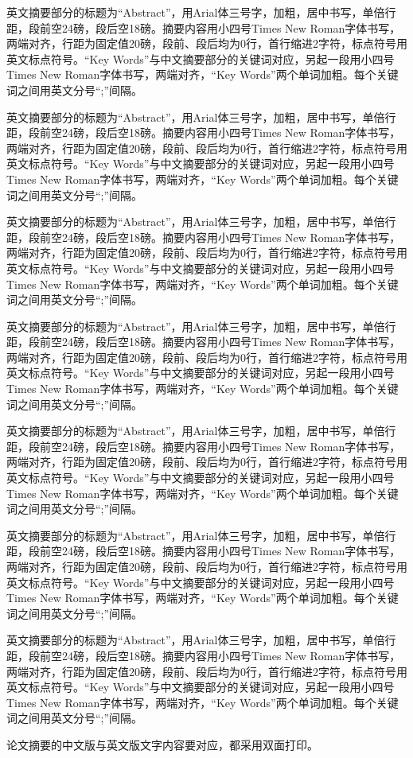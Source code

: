 \begin{enabstract}
	
	英文摘要部分的标题为“Abstract”，用Arial体三号字，加粗，居中书写，单倍行距，段前空24磅，段后空18磅。摘要内容用小四号Times New Roman字体书写，两端对齐，行距为固定值20磅，段前、段后均为0行，首行缩进2字符，标点符号用英文标点符号。“Key Words”与中文摘要部分的关键词对应，另起一段用小四号Times New Roman字体书写，两端对齐，“Key Words”两个单词加粗。每个关键词之间用英文分号“;”间隔。
	
	英文摘要部分的标题为“Abstract”，用Arial体三号字，加粗，居中书写，单倍行距，段前空24磅，段后空18磅。摘要内容用小四号Times New Roman字体书写，两端对齐，行距为固定值20磅，段前、段后均为0行，首行缩进2字符，标点符号用英文标点符号。“Key Words”与中文摘要部分的关键词对应，另起一段用小四号Times New Roman字体书写，两端对齐，“Key Words”两个单词加粗。每个关键词之间用英文分号“;”间隔。
	
	英文摘要部分的标题为“Abstract”，用Arial体三号字，加粗，居中书写，单倍行距，段前空24磅，段后空18磅。摘要内容用小四号Times New Roman字体书写，两端对齐，行距为固定值20磅，段前、段后均为0行，首行缩进2字符，标点符号用英文标点符号。“Key Words”与中文摘要部分的关键词对应，另起一段用小四号Times New Roman字体书写，两端对齐，“Key Words”两个单词加粗。每个关键词之间用英文分号“;”间隔。
	
	英文摘要部分的标题为“Abstract”，用Arial体三号字，加粗，居中书写，单倍行距，段前空24磅，段后空18磅。摘要内容用小四号Times New Roman字体书写，两端对齐，行距为固定值20磅，段前、段后均为0行，首行缩进2字符，标点符号用英文标点符号。“Key Words”与中文摘要部分的关键词对应，另起一段用小四号Times New Roman字体书写，两端对齐，“Key Words”两个单词加粗。每个关键词之间用英文分号“;”间隔。
	
	英文摘要部分的标题为“Abstract”，用Arial体三号字，加粗，居中书写，单倍行距，段前空24磅，段后空18磅。摘要内容用小四号Times New Roman字体书写，两端对齐，行距为固定值20磅，段前、段后均为0行，首行缩进2字符，标点符号用英文标点符号。“Key Words”与中文摘要部分的关键词对应，另起一段用小四号Times New Roman字体书写，两端对齐，“Key Words”两个单词加粗。每个关键词之间用英文分号“;”间隔。
	
	英文摘要部分的标题为“Abstract”，用Arial体三号字，加粗，居中书写，单倍行距，段前空24磅，段后空18磅。摘要内容用小四号Times New Roman字体书写，两端对齐，行距为固定值20磅，段前、段后均为0行，首行缩进2字符，标点符号用英文标点符号。“Key Words”与中文摘要部分的关键词对应，另起一段用小四号Times New Roman字体书写，两端对齐，“Key Words”两个单词加粗。每个关键词之间用英文分号“;”间隔。
	
	英文摘要部分的标题为“Abstract”，用Arial体三号字，加粗，居中书写，单倍行距，段前空24磅，段后空18磅。摘要内容用小四号Times New Roman字体书写，两端对齐，行距为固定值20磅，段前、段后均为0行，首行缩进2字符，标点符号用英文标点符号。“Key Words”与中文摘要部分的关键词对应，另起一段用小四号Times New Roman字体书写，两端对齐，“Key Words”两个单词加粗。每个关键词之间用英文分号“;”间隔。
	
	论文摘要的中文版与英文版文字内容要对应，都采用双面打印。
	
	
	
\end{enabstract}
